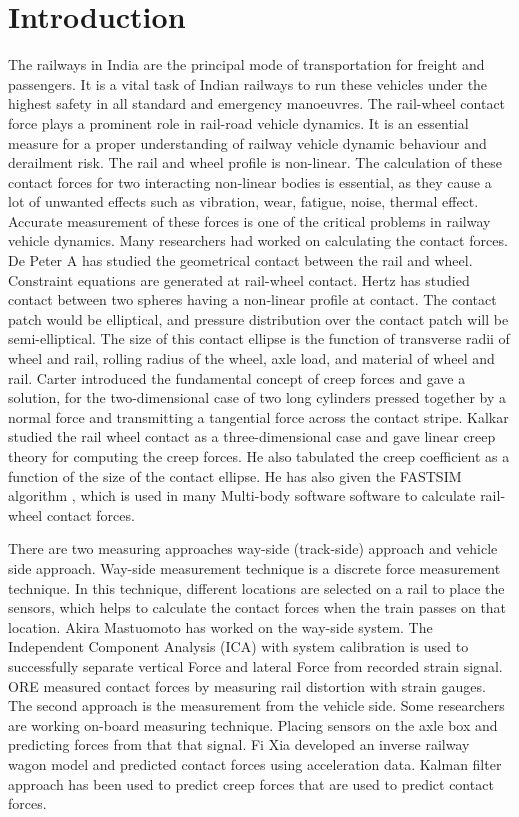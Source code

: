 \documentclass[]{interact}
\theoremstyle{plain}%
\theoremstyle{definition}
\theoremstyle{remark}
\begin{document}
\section{Introduction}
The railways in India are the principal mode of transportation for freight and passengers. It is a vital task of Indian railways to run these vehicles under the highest safety in all standard and emergency manoeuvres. The rail-wheel contact force plays a prominent role in rail-road vehicle dynamics. It is an essential measure for a proper understanding of railway vehicle dynamic  behaviour and derailment risk.  The rail and wheel profile is non-linear. The calculation of these contact forces for two interacting non-linear bodies is essential, as they cause a lot of unwanted effects such as vibration, wear, fatigue, noise, thermal effect. Accurate measurement of these forces is one of the critical problems in railway vehicle dynamics. Many researchers had worked on calculating the contact forces. De Peter A \cite{Pater1,Pater2} has studied the geometrical contact between the rail and wheel. Constraint equations are generated at rail-wheel contact. Hertz \cite{Hertz} has studied contact between two spheres having a non-linear profile at contact. The contact patch would be elliptical, and pressure distribution over the contact patch will be semi-elliptical. The size of this contact ellipse is the function of transverse radii of wheel and rail, rolling radius of the wheel, axle load, and material of wheel and rail. Carter \cite{Carter} introduced the fundamental concept of creep forces and gave a solution, for the two-dimensional case of two long cylinders pressed together by a normal force and transmitting a tangential force across the contact stripe. Kalkar \cite{Kalker1,Kalker2,Kalker3,Kalker4} studied the rail wheel contact as a three-dimensional case and gave linear creep theory for computing the creep forces. He also tabulated the creep coefficient as a function of the size of the contact ellipse. He has also given the FASTSIM algorithm \cite{Kalker5}, which is used in many Multi-body software software to calculate rail-wheel contact forces.

There are two measuring approaches way-side (track-side) approach and vehicle side approach. Way-side  measurement technique is a discrete force measurement technique. In this technique, different locations are selected on a rail to place the sensors, which helps to calculate the contact forces when the train passes on that location. Akira Mastuomoto \cite{Matsumoto} has worked on the way-side system. The Independent Component Analysis (ICA) with system calibration is used to successfully separate vertical Force and lateral Force from recorded strain signal. ORE \cite{ORE} measured contact forces by measuring rail distortion with strain gauges.  The second approach is the measurement from the vehicle side. Some researchers are working on-board measuring technique. Placing sensors on the axle box and predicting forces from that that signal. Fi Xia \cite{Fxia,Fxia1} developed an inverse railway wagon model and predicted contact forces using acceleration data.   Kalman filter approach \cite{Chris,Ward,Lic} has been used to predict creep forces that are used to predict contact forces.                      
\end{document}
